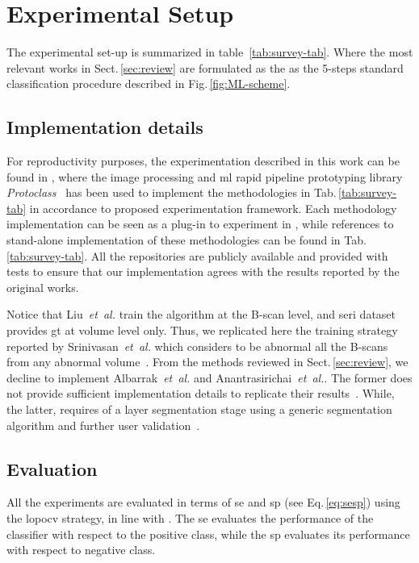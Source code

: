 \graphicspath{ {./content/method/figures/} }

\section{Experimental Setup}\label{sec:exp}

The experimental set-up is summarized in table~\ref{tab:survey-tab}.
Where the most relevant works in Sect.\,\ref{sec:review} are formulated as the as the 5-steps standard classification procedure described in Fig.\,\ref{fig:ML-scheme}.



\subsection{Implementation details}\label{sec:exp:implementation}
For reproductivity purposes, the experimentation described in this work can be found in \cite{rethinopaty20016apr-repoICPR},
where the image processing and \gls{ml} rapid pipeline prototyping library \emph{Protoclass}~\cite{protoclass2016apr-repoICPR} has been used to implement the methodologies in Tab.\,\ref{tab:survey-tab} in accordance to proposed experimentation framework.
Each methodology implementation can be seen as a plug-in to experiment in \cite{rethinopaty20016apr-repoICPR}, while references to stand-alone implementation of these methodologies can be found in Tab.\,\ref{tab:survey-tab}.
All the repositories are publicly available and provided with tests to ensure that our implementation agrees with the results reported by the original works.

Notice that Liu~\emph{et~al.} train the algorithm at the B-scan level, and \gls{seri} dataset provides \gls{gt} at volume level only.
Thus, we replicated here the training strategy reported by Srinivasan~\emph{et~al.} which considers to be abnormal all the B-scans from any abnormal volume~\cite{Srinivasan2014}.
From the methods reviewed in Sect.\,\ref{sec:review}, we decline to implement Albarrak~\emph{et~al.} and Anantrasirichai~\textit{et~al.}.
The former does not provide sufficient implementation details to replicate their results~\cite{albarrak2013age}.
While, the latter, requires of a layer segmentation stage using a generic segmentation algorithm and further user validation~\cite{anantrasirichai2013svm}.


\subsection{Evaluation}\label{sec:exp:evaluation}
All the experiments are evaluated in terms of \gls{se} and \gls{sp} (see Eq.\,\ref{eq:sesp}) using the \gls{lopocv} strategy, in line with \cite{Lemaintre2015miccaiOCT}.
The \gls{se} evaluates the performance of the classifier with respect to the positive class, while the \gls{sp} evaluates its performance with respect to negative class.

